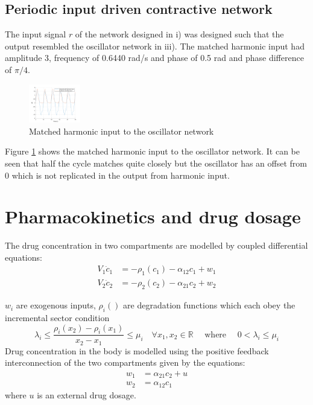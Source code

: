 \documentclass{article}
\begin{document}
\subsection{Periodic input driven contractive network}

The input signal $r$ of the network designed in i) was designed such that the output resembled the oscillator network in iii).
The matched harmonic input had amplitude 3, frequency of 0.6440 rad/s and phase of 0.5 rad and phase difference of $\pi/4$.

\begin{figure}[H]
    \centering
    \includegraphics[width=0.2\textwidth]{figures/15_matched.png}
    \caption{Matched harmonic input to the oscillator network}  
    \label{fig:matched_harmonic_input}
\end{figure}

Figure \ref{fig:matched_harmonic_input} shows the matched harmonic input to the oscillator network.
It can be seen that half the cycle matches quite closely but the oscillator has an offset from 0 which is not replicated in the output from harmonic input.


\section{Pharmacokinetics and drug dosage}

The drug concentration in two compartments are modelled by coupled differential equations:
\begin{align}
    V_1 \dot{c}_1 &= - \rho_1(c_1) - \alpha_{12}c_1 + w_1 \\
    V_2 \dot{c}_2 &= - \rho_2(c_2) - \alpha_{21}c_2 + w_2
\end{align}

$w_i$ are exogenous inputs, $\rho_i()$ are degradation functions which each obey the incremental sector condition
\begin{equation}
    \lambda_i \leq \frac{\rho_i(x_2) - \rho_i(x_1)}{x_2 - x_1} \leq \mu_i \quad \forall x_1, x_2 \in \mathbb{R} \quad \text{ where } \quad 0 < \lambda_i \leq \mu_i
\end{equation}
Drug concentration in the body is modelled using the positive feedback interconnection of the two compartments given by the equations:
\begin{align}
    w_1 &= \alpha_{21} c_2 + u \\
    w_2 &= \alpha_{12} c_1
\end{align}
where $u$ is an external drug dosage.
\end{document}
